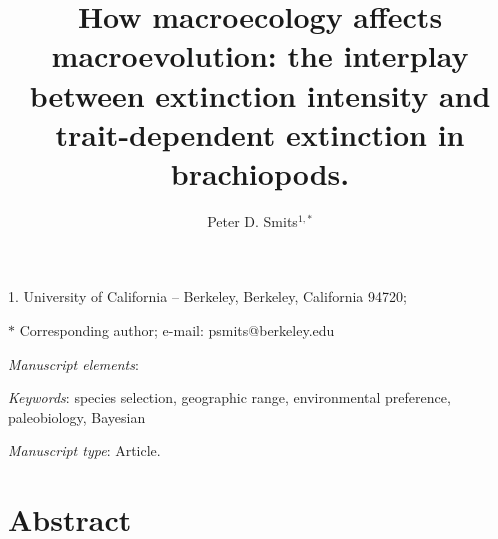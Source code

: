 \documentclass[11pt]{article}
\title{How macroecology affects macroevolution: the interplay between extinction intensity and trait-dependent extinction in brachiopods.}
\author{Peter D. Smits$^{1,\ast}$}
\date{}
\begin{document}
\maketitle

\noindent{} 1. University of California -- Berkeley, Berkeley, California 94720;

\noindent{} $\ast$ Corresponding author; e-mail: psmits@berkeley.edu

\bigskip

\textit{Manuscript elements}: 

\bigskip

\textit{Keywords}: species selection, geographic range, environmental preference, paleobiology, Bayesian

\bigskip

\textit{Manuscript type}: Article. %

\bigskip


\linenumbers{}
\modulolinenumbers[3]

\newpage{}

\section*{Abstract}
\end{document}
